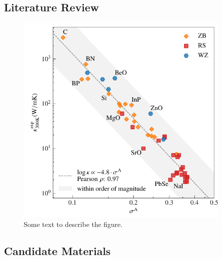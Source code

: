 \subsection{Literature Review}


\begin{figure}
	\includegraphics[width=4.1in]{./data/plots/anharmonicity/9_kappa/sigma_vs_kappa.pdf}
	\caption{
		Some text to describe the figure.
	}
\end{figure}



\subsection{Candidate Materials}